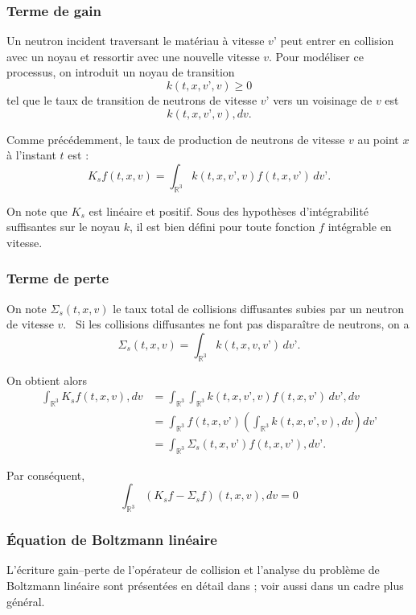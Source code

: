 \documentclass{article}
\begin{document}
\subsubsection{Terme de gain}

Un neutron incident traversant le matériau à vitesse $v’$ peut entrer en collision avec un noyau et ressortir avec une nouvelle vitesse $v$. Pour modéliser ce processus, on introduit un noyau de transition
\[
k(t,x,v’,v) \geq 0
\]
tel que le taux de transition de neutrons de vitesse $v’$ vers un voisinage de $v$ est
\[
k(t,x,v’,v),dv.
\]

\medskip

Comme précédemment, le taux de production de neutrons de vitesse $v$ au point $x$ à l'instant $t$ est :
\[
K_sf(t,x,v) = \int_{\mathbb{R}^3} k(t,x,v’,v)f(t,x,v’)\,dv’.
\]

On note que $K_s$ est linéaire et positif. Sous des hypothèses d'intégrabilité suffisantes sur le noyau $k$, il est bien défini pour toute fonction $f$ intégrable en vitesse.

\subsubsection{Terme de perte}

On note $\Sigma_s(t,x,v)$ le taux total de collisions diffusantes subies par un neutron de vitesse $v$. \
Si les collisions diffusantes ne font pas disparaître de neutrons, on a
\[
    \Sigma_s(t,x,v) = \int_{\mathbb{R}^3} k(t,x,v,v’)\,dv’.
\]

On obtient alors
\begin{align*}
    \int_{\mathbb{R}^3} K_sf(t,x,v),dv &= \int_{\mathbb{R}^3}\!\int_{\mathbb{R}^3} k(t,x,v’,v)f(t,x,v’)\,dv’,dv \\
    &= \int_{\mathbb{R}^3} f(t,x,v’) \left(\int_{\mathbb{R}^3}k(t,x,v’,v),dv\right)dv’ \\
    &=\int_{\mathbb{R}^3} \Sigma_s(t,x,v’)f(t,x,v’),dv’.
\end{align*}

Par conséquent,
\[
\int_{\mathbb{R}^3}
\left(K_s f-\Sigma_s f\right)(t,x,v),dv = 0
\]

\subsubsection{Équation de Boltzmann linéaire}
L'écriture gain--perte de l'opérateur de collision et l'analyse du problème de Boltzmann linéaire sont présentées en détail dans \cite[chap.~3]{Allaire2018}; voir aussi \textcite{CaseZweifel1967} dans un cadre plus général.
\end{document}
